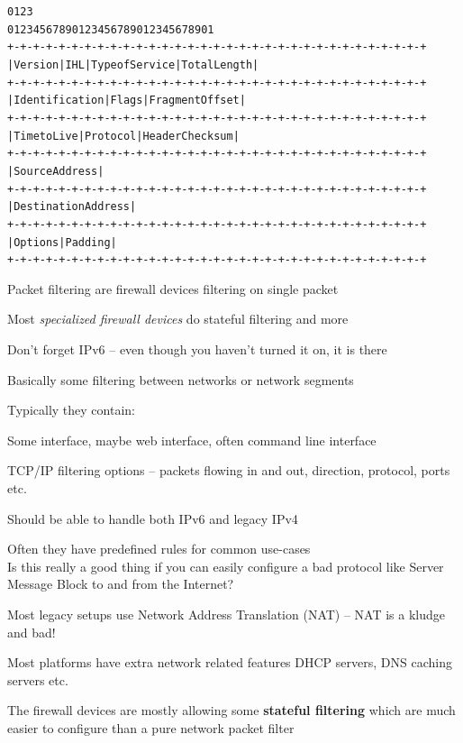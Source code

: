 \documentclass[Screen16to9,17pt]{foils}
\begin{document}

\begin{alltt}\footnotesize
0                   1                   2                   3
0 1 2 3 4 5 6 7 8 9 0 1 2 3 4 5 6 7 8 9 0 1 2 3 4 5 6 7 8 9 0 1
+-+-+-+-+-+-+-+-+-+-+-+-+-+-+-+-+-+-+-+-+-+-+-+-+-+-+-+-+-+-+-+-+
|Version|  IHL  |Type of Service|          Total Length         |
+-+-+-+-+-+-+-+-+-+-+-+-+-+-+-+-+-+-+-+-+-+-+-+-+-+-+-+-+-+-+-+-+
|         Identification        |Flags|      Fragment Offset    |
+-+-+-+-+-+-+-+-+-+-+-+-+-+-+-+-+-+-+-+-+-+-+-+-+-+-+-+-+-+-+-+-+
|  Time to Live |    Protocol   |         Header Checksum       |
+-+-+-+-+-+-+-+-+-+-+-+-+-+-+-+-+-+-+-+-+-+-+-+-+-+-+-+-+-+-+-+-+
|                       Source Address                          |
+-+-+-+-+-+-+-+-+-+-+-+-+-+-+-+-+-+-+-+-+-+-+-+-+-+-+-+-+-+-+-+-+
|                    Destination Address                        |
+-+-+-+-+-+-+-+-+-+-+-+-+-+-+-+-+-+-+-+-+-+-+-+-+-+-+-+-+-+-+-+-+
|                    Options                    |    Padding    |
+-+-+-+-+-+-+-+-+-+-+-+-+-+-+-+-+-+-+-+-+-+-+-+-+-+-+-+-+-+-+-+-+
\end{alltt}

\begin{list1}
\item Packet filtering are firewall devices filtering on single packet
\item Most \emph{specialized firewall devices} do stateful filtering and more
\item Don't forget IPv6 -- even though you haven't turned it on, it is there
\end{list1}





\begin{list1}
\item Basically some filtering between networks or network segments
\item Typically they contain:
  \begin{list2}
   \item Some interface, maybe web interface, often command line interface
\item TCP/IP filtering options -- packets flowing in and out, direction, protocol, ports etc.
\item Should be able to handle both IPv6 and legacy IPv4
\item Often they have predefined rules for common use-cases\\
Is this really a good thing if you can easily configure a bad protocol like Server Message Block to and from the Internet?
\item Most legacy setups use Network Address Translation (NAT) -- NAT is a kludge and bad!
\item Most platforms have extra network related features DHCP servers, DNS caching servers etc.
\end{list2}
\item The firewall devices are mostly allowing some {\bf stateful filtering} which are much easier to configure than a pure network packet filter
\end{list1}
\end{document}
